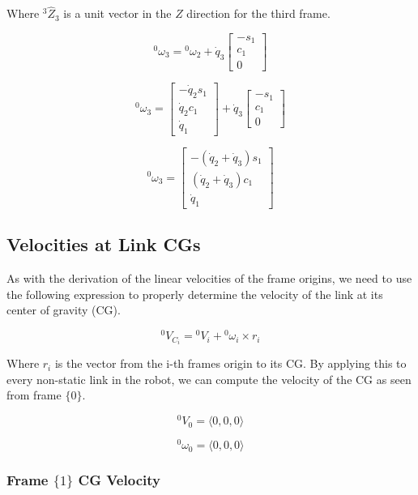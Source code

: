 \noindent Where ${}^{3}\hat{Z}_{3}$ is a unit vector in the $Z$ direction for the third frame.



$$
{}^{0}\omega_3 = {}^{0}\omega_{2} + \dot{q}_{3} \left[\begin{array}{c}
 -s_{1} \\ c_{1} \\ 0 \end{array}\right]
$$



$$
{}^{0}\omega_3 = \left[\begin{array}{c} -\dot{q}_{2}s_{1} \\ \dot{q}_{2}c_{1} \\ \dot{q}_{1}
\end{array}\right] + \dot{q}_{3} \left[\begin{array}{c}
 -s_{1} \\ c_{1} \\ 0 \end{array}\right]
$$


$$
{}^{0}\omega_3 = \begin{bmatrix}
-(\dot{q}_2 + \dot{q}_3)s_1 \\
(\dot{q}_2 + \dot{q}_3)c_1 \\
\dot{q}_1
\end{bmatrix}
$$

\subsection*{Velocities at Link CGs}

As with the derivation of the linear velocities of the frame origins, we need to use the following expression to properly determine the velocity of the link at its center of gravity (CG).

$$
{}^{0}V_{C_{i}} = {}^{0}V_{i} + {}^{0}\omega_i \times r_i
$$

\noindent Where $r_i$ is the vector from the i-th frames origin to its CG. By applying this to every non-static link in the robot, we can compute the velocity of the CG as seen from frame $\{ 0 \}$.

$$
{}^{0}V_{0} = \langle 0,0,0 \rangle
$$

$$
{}^{0}\omega_{0} = \langle 0,0,0 \rangle
$$


\subsubsection*{Frame $\{ 1 \}$ CG Velocity}

